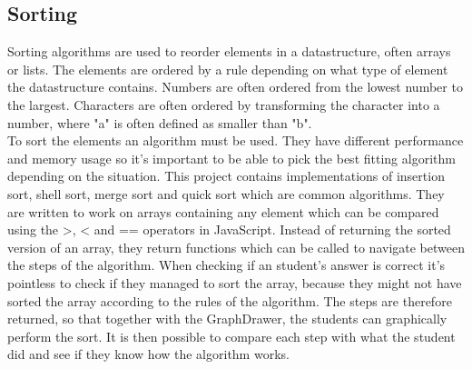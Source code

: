 \subsection{Sorting}
Sorting algorithms are used to reorder elements in a datastructure, often arrays or lists. The elements are ordered by a rule depending on what type of element the datastructure contains. Numbers are often ordered from the lowest number to the largest. Characters are often ordered by transforming the character into a number, where "a" is often defined as smaller than "b".
\\[11pt]
To sort the elements an algorithm must be used. They have different performance and memory usage so it's important to be able to pick the best fitting algorithm depending on the situation. This project contains implementations of insertion sort, shell sort, merge sort and quick sort which are common algorithms. They are written to work on arrays containing any element which can be compared using the >, < and == operators in JavaScript. Instead of returning the sorted version of an array, they return functions which can be called to navigate between the steps of the algorithm. When checking if an student's answer is correct it's pointless to check if they managed to sort the array, because they might not have sorted the array according to the rules of the algorithm. The steps are therefore returned, so that together with the GraphDrawer, the students can graphically perform the sort. It is then possible to compare each step with what the student did and see if they know how the algorithm works.








